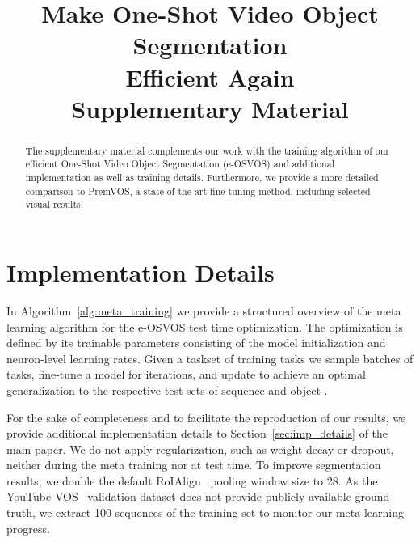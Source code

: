 \documentclass{article}
\newif\ifarxiv
\begin{document}
\ifarxiv
    \setcounter{section}{0}
    \setcounter{figure}{0}
    \setcounter{table}{0}
    \setcounter{equation}{0}
    \setcounter{footnote}{0}

    \title{Make One-Shot Video Object Segmentation \\ Efficient Again \\ {\normalfont Supplementary Material}}
    \clearpage
    \maketitle
    \let\maketitle\relax

    \begin{abstract}
The supplementary material complements our work with the training algorithm of our efficient One-Shot Video Object Segmentation (e-OSVOS) and additional implementation as well as training details.
Furthermore, we provide a more detailed comparison to PremVOS, a state-of-the-art fine-tuning method, including selected visual results.
\end{abstract}

\section{Implementation Details}

    In Algorithm~\ref{alg:meta_training} we provide a structured overview of the meta learning algorithm for the e-OSVOS test time optimization.
The optimization is defined by its trainable parameters  consisting of the model initialization and neuron-level learning rates.
Given a taskset  of training tasks we sample batches of tasks, fine-tune a model for  iterations, and update  to achieve an optimal generalization to the respective test sets  of sequence  and object .

    For the sake of completeness and to facilitate the reproduction of our results, we provide additional implementation details to Section~\ref{sec:imp_details} of the main paper.
We do not apply regularization, such as weight decay or dropout, neither during the meta training nor at test time.
To improve segmentation results, we double the default RoIAlign~\cite{MaskRCNN} pooling window size to 28.
As the YouTube-VOS~\cite{Xu2018YouTubeVOSAL} validation dataset does not provide publicly available ground truth, we extract 100 sequences of the training set to monitor our meta learning progress.
\end{document}
